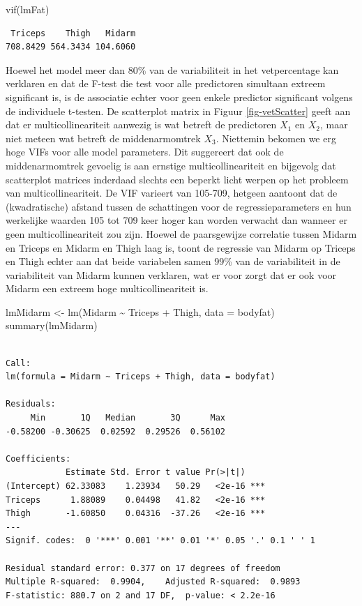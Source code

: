 \documentclass[
  dutch,
  letterpaper,
  12pt]{book}
\newenvironment{Shaded}{\begin{snugshade}}{\end{snugshade}}
\newcommand{\AttributeTok}[1]{\textcolor[rgb]{0.40,0.45,0.13}{#1}}
\newcommand{\FunctionTok}[1]{\textcolor[rgb]{0.28,0.35,0.67}{#1}}
\newcommand{\NormalTok}[1]{\textcolor[rgb]{0.00,0.23,0.31}{#1}}
\newcommand{\OtherTok}[1]{\textcolor[rgb]{0.00,0.23,0.31}{#1}}
\newcommand{\SpecialCharTok}[1]{\textcolor[rgb]{0.37,0.37,0.37}{#1}}
\theoremstyle{definition}
\theoremstyle{definition}
\theoremstyle{definition}
\theoremstyle{remark}
\begin{document}
\begin{Shaded}
\begin{Highlighting}[]
\FunctionTok{vif}\NormalTok{(lmFat)}
\end{Highlighting}
\end{Shaded}

\begin{verbatim}
 Triceps    Thigh   Midarm 
708.8429 564.3434 104.6060 
\end{verbatim}

Hoewel het model meer dan 80\% van de variabiliteit in het vetpercentage
kan verklaren en dat de F-test die test voor alle predictoren simultaan
extreem significant is, is de associatie echter voor geen enkele
predictor significant volgens de individuele t-testen. De scatterplot
matrix in Figuur \ref{fig-vetScatter} geeft aan dat er
multicollineariteit aanwezig is wat betreft de predictoren \(X_1\) en
\(X_2\), maar niet meteen wat betreft de middenarmomtrek \(X_3\).
Niettemin bekomen we erg hoge VIFs voor alle model parameters. Dit
suggereert dat ook de middenarmomtrek gevoelig is aan ernstige
multicollineariteit en bijgevolg dat scatterplot matrices inderdaad
slechts een beperkt licht werpen op het probleem van
multicollineariteit. De VIF varieert van 105-709, hetgeen aantoont dat
de (kwadratische) afstand tussen de schattingen voor de
regressieparameters en hun werkelijke waarden 105 tot 709 keer hoger kan
worden verwacht dan wanneer er geen multicollineariteit zou zijn. Hoewel
de paarsgewijze correlatie tussen Midarm en Triceps en Midarm en Thigh
laag is, toont de regressie van Midarm op Triceps en Thigh echter aan
dat beide variabelen samen 99\% van de variabiliteit in de variabiliteit
van Midarm kunnen verklaren, wat er voor zorgt dat er ook voor Midarm
een extreem hoge multicollineariteit is.

\begin{Shaded}
\begin{Highlighting}[]
\NormalTok{lmMidarm }\OtherTok{\textless{}{-}} \FunctionTok{lm}\NormalTok{(Midarm }\SpecialCharTok{\textasciitilde{}}\NormalTok{ Triceps }\SpecialCharTok{+}\NormalTok{ Thigh, }\AttributeTok{data =}\NormalTok{ bodyfat)}
\FunctionTok{summary}\NormalTok{(lmMidarm)}
\end{Highlighting}
\end{Shaded}

\begin{verbatim}

Call:
lm(formula = Midarm ~ Triceps + Thigh, data = bodyfat)

Residuals:
     Min       1Q   Median       3Q      Max 
-0.58200 -0.30625  0.02592  0.29526  0.56102 

Coefficients:
            Estimate Std. Error t value Pr(>|t|)    
(Intercept) 62.33083    1.23934   50.29   <2e-16 ***
Triceps      1.88089    0.04498   41.82   <2e-16 ***
Thigh       -1.60850    0.04316  -37.26   <2e-16 ***
---
Signif. codes:  0 '***' 0.001 '**' 0.01 '*' 0.05 '.' 0.1 ' ' 1

Residual standard error: 0.377 on 17 degrees of freedom
Multiple R-squared:  0.9904,    Adjusted R-squared:  0.9893 
F-statistic: 880.7 on 2 and 17 DF,  p-value: < 2.2e-16
\end{verbatim}
\end{document}
